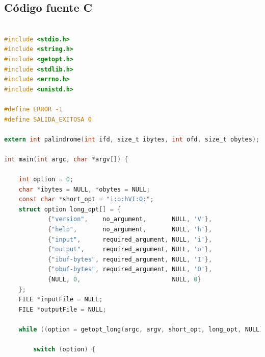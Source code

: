 \documentclass[a4paper]{article}
\begin{document}
\subsection{Código fuente C}
\begin{lstlisting}[language=C]

#include <stdio.h>
#include <string.h>
#include <getopt.h>
#include <stdlib.h>
#include <errno.h>
#include <unistd.h>

#define ERROR -1
#define SALIDA_EXITOSA 0

extern int palindrome(int ifd, size_t ibytes, int ofd, size_t obytes);

int main(int argc, char *argv[]) {

    int option = 0;
    char *ibytes = NULL, *obytes = NULL;
    const char *short_opt = "i:o:hVI:O:";
    struct option long_opt[] = {
            {"version",    no_argument,       NULL, 'V'},
            {"help",       no_argument,       NULL, 'h'},
            {"input",      required_argument, NULL, 'i'},
            {"output",     required_argument, NULL, 'o'},
            {"ibuf-bytes", required_argument, NULL, 'I'},
            {"obuf-bytes", required_argument, NULL, 'O'},
            {NULL, 0,                         NULL, 0}
    };
    FILE *inputFile = NULL;
    FILE *outputFile = NULL;

    while ((option = getopt_long(argc, argv, short_opt, long_opt, NULL)) != -1){
       
        switch (option) {
           

\end{lstlisting}
\end{document}
